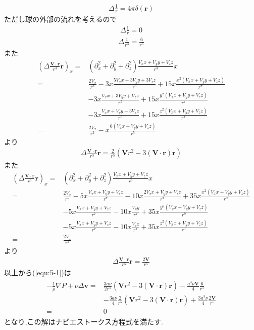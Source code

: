 \documentclass[uplatex,a4j,11pt,dvipdfmx]{jsarticle}
\begin{document}
\begin{align}
  \Delta\frac{1}{r}=4\pi\delta({\bm r})
\end{align}
ただし球の外部の流れを考えるので
\begin{align}
  \Delta\frac{1}{r}=0
\end{align}
\begin{align}
  \Delta \frac{1}{r^3}=\frac{6}{r^5}
\end{align}
また
\begin{align*}
  \left(\Delta \frac{{\bm V}\cdot{\bm r}}{r^3}{\bm r}\right)_x
  =&\left(\partial_x^2+\partial_y^2+\partial_z^2\right)\frac{V_xx+V_yy+V_zz}{r^3}x\\
  =&\frac{2V_x}{r^3}-3x\frac{5V_xx+3V_yy+3V_zz}{r^5}+15x\frac{x^2(V_xx+V_yy+V_zz)}{r^7}\\
  &-3x\frac{V_xx+3V_yy+V_zz}{r^5}+15x\frac{y^2(V_xx+V_yy+V_zz)}{r^7}\\
  &-3x\frac{V_xx+V_yy+3V_zz}{r^5}+15x\frac{z^2(V_xx+V_yy+V_zz)}{r^7}\\
  =&\frac{2V_x}{r^3}-x\frac{6(V_xx+V_yy+V_zz)}{r^5}
\end{align*}
より
\begin{align}
  \Delta \frac{{\bm V}\cdot{\bm r}}{r^3}{\bm r}=\frac{2}{r^5}\left({\bm V}r^2-3({\bm V}\cdot{\bm r}){\bm r}\right)
\end{align}
また
\begin{align*}
  \left(\Delta\frac{{\bm V}\cdot{\bm r}}{r^5}{\bm r}\right)_x
  =&\left(\partial_x^2+\partial_y^2+\partial_z^2\right)\frac{V_xx+V_yy+V_zz}{r^5}x\\
  =&\frac{2V_x}{r^5}-5x\frac{V_xx+V_yy+V_zz}{r^7}-10x\frac{2V_xx+V_yy+V_zz}{r^7}+35x\frac{x^2(V_xx+V_yy+V_zz)}{r^9}\\
  &-5x\frac{V_xx+V_yy+V_zz}{r^7}-10x\frac{V_yy}{r^7}+35x\frac{y^2(V_xx+V_yy+V_zz)}{r^9}\\
  &-5x\frac{V_xx+V_yy+V_zz}{r^7}-10x\frac{V_zz}{r^7}+35x\frac{z^2(V_xx+V_yy+V_zz)}{r^9}\\
  =&\frac{2V_x}{r^5}
\end{align*}
より
\begin{align}
  \Delta\frac{{\bm V}\cdot{\bm r}}{r^5}{\bm r}=\frac{2{\bm V}}{r^5}
\end{align}
以上から(\ref{equ:5-1})は
\begin{align}
  \begin{split}
    -\frac{1}{\rho}\nabla P+\nu\Delta{\bm v}
    =&\frac{3a\nu}{2r^5}\left({\bm V}r^2-3({\bm V}\cdot{\bm r}){\bm r}\right)-\frac{a^3\nu{\bm V}}{4}\frac{6}{r^5}\\
    &-\frac{3a\nu}{4}\frac{2}{r^5}\left({\bm V}r^2-3({\bm V}\cdot{\bm r}){\bm r}\right)
    +\frac{3a^3\nu}{4}\frac{2{\bm V}}{r^5}\\
    =&0
  \end{split}
\end{align}
となり,この解はナビエストークス方程式を満たす.
\end{document}
